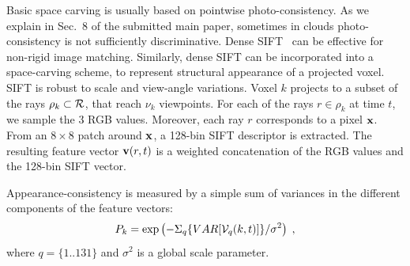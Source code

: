 \documentclass[runningheads]{llncs}
\begin{document}
Basic space carving is usually based on pointwise photo-consistency. As we explain in Sec.~8 of the submitted main paper, sometimes in clouds photo-consistency is not sufficiently discriminative. Dense SIFT~\cite{DenseSift2011} can be effective for non-rigid image matching. Similarly, dense SIFT can be incorporated into a space-carving scheme, to represent structural appearance of a projected voxel. SIFT is robust to scale and view-angle variations.
Voxel $k$ projects to a subset of the rays $\rho_k\subset{\cal R}$,
that reach $\nu_k$ viewpoints. 
For each of the rays $r\in\rho_k$ at time $t$, we sample the 3 RGB values. Moreover, each ray $r$ corresponds to a pixel ${\bf x}$. From an $8 \times 8$ patch around ${\bf x}$, a 
128-bin SIFT descriptor is extracted.
The resulting feature vector ${\bf v}(r,t)$ is a weighted concatenation of the RGB values and the 128-bin SIFT vector.

Appearance-consistency is measured by a simple sum of variances in the different components of the feature vectors:
\begin{equation}
 P_k= \exp\left(
         -\Sigma_q\{VAR[{\cal V}_q(k,t)]\}/\sigma^2
         \right)
  \;,
 \label{eq:Dist}
\end{equation}
where $q=\{1..131\}$ and $\sigma^2$ is a global scale parameter.






\end{document}

